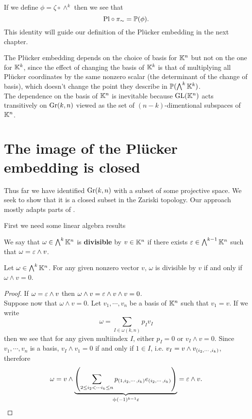 \begin{remark}
If we define $\phi=\zeta\circ \wedge^k$ then we see that \[\mathrm{Pl}\circ \pi_\sim=\mathbb{P}(\phi).\]
This identity will guide our definition of the Pl\"ucker embedding in the next chapter.
\end{remark}


\begin{remark}
The Pl\"ucker embedding depends on the choice of basis for $\mathbb{K}^n$ but not on the one for $\mathbb{K}^k$, since the effect of changing the basis of $\mathbb{K}^k$ is that of multiplying all Pl\"ucker coordinates by the same nonzero scalar (the determinant of the change of basis), which doesn't change the point they describe in $\mathbb{P}(\bigwedge^k\mathbb{K}^k)$.\\
The dependence on the basis of $\mathbb{K}^n$ is inevitable because $\mathrm{GL}(\mathbb{K}^n)$ acts transitively on $\mathrm{Gr}(k,n)$ viewed as the set of $(n-k)$-dimentional subspaces of $\mathbb{K}^n$.
\end{remark}



\section{The image of the Pl\"ucker embedding is closed}
Thus far we have identified $\mathrm{Gr}(k,n)$ with a subset of some projective space. We seek to show that it is a closed subset in the Zariski topology. Our approach mostly adapts parts of \cite{McKernan}.
\medskip

\noindent First we need some linear algebra results

\begin{definition}[Divisibility]
We say that $\omega\in \bigwedge^k\mathbb{K}^n$ is \textbf{divisible} by $v\in\mathbb{K}^n$ if there exists $\varepsilon\in \bigwedge^{k-1}\mathbb{K}^n$ such that $\omega=\varepsilon\wedge v$.
\end{definition}
\begin{lemma}\label{Divisibility}
Let $\omega\in \bigwedge^k\mathbb{K}^n$. For any given nonzero vector $v$, $\omega$ is divisible by $v$ if and only if $\omega\wedge v=0$.
\end{lemma}
\begin{proof}
If $\omega=\varepsilon\wedge v$ then $\omega\wedge v=\varepsilon\wedge v\wedge v=0$.\\
Suppose now that $\omega\wedge v=0$. Let $v_1,\cdots, v_n$ be a basis of $\mathbb{K}^n$ such that $v_1=v$. 
If we write
\[\omega=\sum_{I\in\omega(k,n)}p_I v_I\]
then we see that for any given multiindex $I$, either $p_I=0$ or $v_I\wedge v=0$. 
Since $v_1,\cdots, v_n$ is a basis, $v_I\wedge v_1=0$ if and only if $1\in I$, i.e. $v_I=v\wedge v_{\left({i_2,\cdots, i_k}\right)}$, therefore
\[\omega=v\wedge \underset{\doteqdot (-1)^{k-1}\varepsilon}{\underbrace{\left({\sum_{2\leq i_2<\cdots i_k\leq n} p_{\left({1,i_2,\cdots, i_k}\right)} e_{\left({i_2,\cdots, i_k}\right)}}\right)}}=\varepsilon\wedge v.\]
\end{proof}

